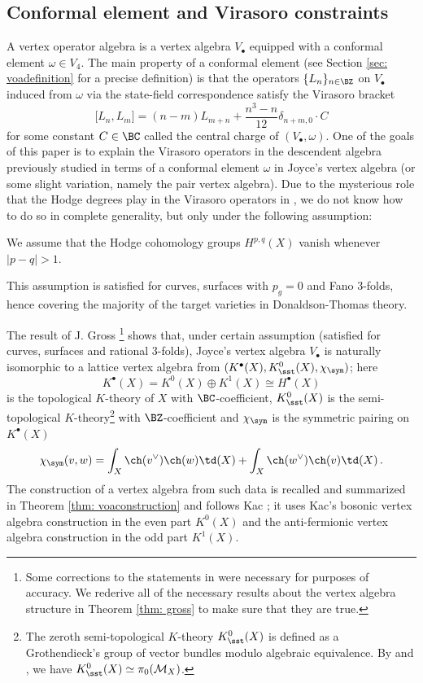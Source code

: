 \subsection{Conformal element and Virasoro constraints}
\label{sec: introconformal}

A vertex operator algebra is a vertex algebra $V_\bullet$ equipped with a conformal element $\omega\in V_4$. The main property of a conformal element (see Section \ref{sec: voadefinition} for a precise definition) is that the operators $\{L_n\}_{n\in \BZ}$ on $V_\bullet$ induced from $\omega$ via the state-field correspondence satisfy the Virasoro bracket
\[\big[L_n,L_m\big] = (n-m)L_{m+n} + \frac{n^3-n}{12}\delta_{n+m,0}\cdot C\]
for some constant $C\in \BC$ called the central charge of $(V_\bullet, \omega)$. One of the goals of this paper is to explain the Virasoro operators in the descendent algebra previously studied in terms of a conformal element $\omega$ in Joyce's vertex algebra (or some slight variation, namely the pair vertex algebra). Due to the mysterious role that the Hodge degrees play in the Virasoro operators in \cite{moreira}, we do not know how to do so in complete generality, but only under the following assumption:


\begin{assumption}
\notready
\label{Ass: vanishing}
We assume that the Hodge cohomology groups $H^{p,q}(X)$ vanish whenever $|p-q|>1$.
\end{assumption}
This assumption is satisfied for curves, surfaces with $p_g=0$ and Fano 3-folds, hence covering the majority of the target varieties in Donaldson-Thomas theory.

The result of J. Gross \cite{Gr19}\footnote{Some corrections to the statements in \cite{Gr19} were necessary for purposes of accuracy. We rederive all of the necessary results about the vertex algebra structure in Theorem \ref{thm: gross} to make sure that they are true.} shows that, under certain assumption (satisfied for curves, surfaces and rational 3-folds), Joyce's vertex algebra $V_\bullet$ is naturally isomorphic to a lattice vertex algebra from $(K^\bullet(X), K_\sst^0(X), \chi_\sym)$; here
\[K^\bullet(X)=K^0(X)\oplus K^1(X)\cong H^\bullet(X)\] is the topological $K$-theory of $X$ with $\BC$-coefficient, $K_\sst^0(X)$ is the semi-topological $K$-theory\footnote{The zeroth semi-topological $K$-theory $K^0_\sst(X)$ is defined as a Grothendieck's group of vector bundles modulo algebraic equivalence. By \cite[Theorem 4.21]{B16} and \cite[Theorem 2.3]{AH18}, we have $K^0_\sst(X)\simeq \pi_0(\mathcal{M}_X)$.} with $\BZ$-coefficient and $\chi_\sym$ is the symmetric pairing on $K^\bullet(X)$
\[\chi_\sym(v,w)=\int_{X}\ch(v^\vee)\ch(w)\td(X)+\int_{X}\ch(w^\vee)\ch(v)\td(X)\,.\]
The construction of a vertex algebra from such data is recalled and summarized in Theorem \ref{thm: voaconstruction} and follows Kac \cite{Ka98}; it uses Kac's bosonic vertex algebra construction in the even part $K^0(X)$ and the anti-fermionic vertex algebra construction in the odd part $K^1(X)$.

